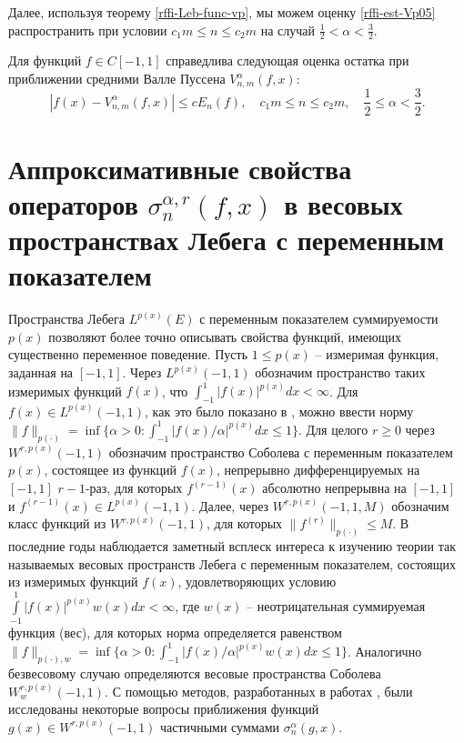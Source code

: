 Далее, используя теорему \ref{rffi-Leb-func-vp}, мы можем оценку \eqref{rffi-est-Vp05} распространить при условии $c_1 m \le n \le c_2 m$ на случай $\frac{1}{2} < \alpha < \frac{3}{2}$.
\begin{theorem}\label{rffi-Leb-func-vp-vp}
Для функций $f \in C[-1,1]$ справедлива следующая оценка остатка при приближении средними Валле Пуссена $V_{n,m}^\alpha(f,x)$:
\begin{equation*}
|f(x)-V_{n,m}^\alpha(f,x)| \le c E_n(f),
\quad c_1 m \le n \le c_2 m, \quad \frac{1}{2} \le \alpha < \frac{3}{2}.
\end{equation*}
\end{theorem}



\chapter{Аппроксимативные свойства операторов $\sigma^{\alpha,r}_n(f,x)$ в весовых пространствах Лебега с переменным показателем}

Пространства Лебега $L^{p(x)}(E)$ с переменным показателем суммируемости $p(x)$ позволяют более точно описывать свойства функций, имеющих существенно переменное поведение. %
Пусть $1\le p(x)$ -- измеримая функция, заданная на $[-1,1]$. Через $L^{p(x)}(-1,1)$ обозначим пространство таких измеримых функций $f(x)$, что $\int_{-1}^1|f(x)|^{p(x)}dx <\infty$. Для $f(x)\in L^{p(x)}(-1,1)$, как это было показано в \cite{rffi-20}, можно  ввести норму $\|f\|_{p(\cdot)}=\inf\{\alpha>0:\int_{-1}^1|f(x)/\alpha|^{p(x)}dx\le1\}$. Для целого $r\ge0$
через $W^{r,p(x)}(-1,1)$ обозначим пространство Соболева с переменным показателем $p(x)$, состоящее из функций $f(x)$, непрерывно дифференцируемых на $[-1,1]$ $r-1$-раз, для которых $f^{(r-1)}(x)$ абсолютно непрерывна на $[-1,1]$  и $f^{(r-1)}(x)\in L^{p(x)}(-1,1)$.
Далее, через  $W^{r,p(x)}(-1,1,M)$ обозначим класс функций из $W^{r,p(x)}(-1,1)$, для которых $\|f^{(r)}\|_{p(\cdot)}\le M$.
В последние годы наблюдается заметный всплеск интереса к изучению теории так называемых весовых пространств Лебега с переменным показателем, состоящих из измеримых функций $f(x)$, удовлетворяющих условию $\int\limits_{-1}^{1} |f(x)|^{p(x)} w(x) dx < \infty$, где $w(x)$ -- неотрицательная суммируемая функция (вес), для которых норма определяется равенством $\|f\|_{p(\cdot),w}=\inf\{\alpha>0:\int_{-1}^1|f(x)/\alpha|^{p(x)}w(x)dx\le1\}$. Аналогично безвесовому случаю определяются весовые пространства Соболева $W^{r,p(x)}_w(-1,1)$. С помощью методов, разработанных в работах \cite{rffi-26, rffi-27, rffi-28, rffi-29, rffi-30, rffi-31, rffi-32}, были исследованы некоторые вопросы приближения функций $g(x)\in W^{r,p(x)}(-1,1)$ частичными суммами $\sigma_n^\alpha(g,x)$.

